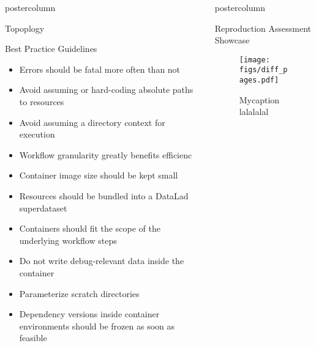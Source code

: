 \begin{frame}
\begin{columns}
\begin{column}{.42\textwidth}
\begin{beamercolorbox}[center]{postercolumn}
\begin{minipage}{.98\textwidth}
{\begin{myblock}{Topoplogy}
					\end{myblock}\vfill
					\begin{myblock}{Best Practice Guidelines}
						\vspace{0.5em}
						\Large
						\begin{itemize}
							\item Errors should be fatal more often than not
							\item Avoid assuming or hard-coding absolute paths to resources
							\item Avoid assuming a directory context for execution
							\item Workflow granularity greatly benefits efficienc
							\item Container image size should be kept small
							\item Resources should be bundled into a DataLad superdataset
							\item Containers should fit the scope of the underlying workflow steps
							\item Do not write debug-relevant data inside the container
							\item Parameterize scratch directories
							\item Dependency versions inside container environments should be frozen as soon as feasible
						\end{itemize}
					\end{myblock}\vfill
		}\end{minipage}\end{beamercolorbox}
	\end{column}
	\begin{column}{.59\textwidth}
		\begin{beamercolorbox}[center]{postercolumn}
			\begin{minipage}{.98\textwidth} %
				\parbox[t][\columnheight]{\textwidth}{ %
					\begin{myblock}{Reproduction Assessment Showcase}
						\vspace{0.75em}
						\begin{minipage}{.58\textwidth}
						\begin{figure}
							\texttt{[image: figs/diff\_pages.pdf]}
							\vspace{0.2em}
							\caption{
								Mycaption lalalalal
							}
						\end{figure}
						\begin{figure}

\end{figure}
\end{minipage}
\end{myblock}}
\end{minipage}
\end{beamercolorbox}
\end{column}
\end{columns}
\end{frame}
